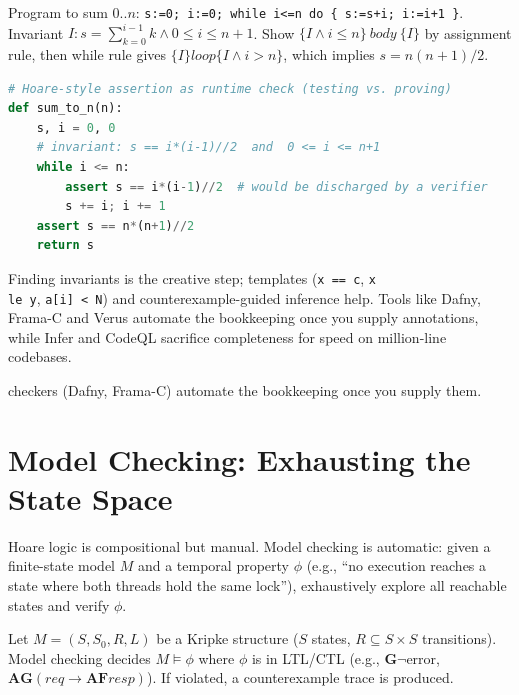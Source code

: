 \begin{example}
Program to sum $0$..$n$: \texttt{s:=0; i:=0; while i<=n do \{ s:=s+i; i:=i+1 \}}. Invariant $I: s=\sum_{k=0}^{i-1}k \land 0\le i\le n+1$. Show $\{I\land i\le n\}~body~\{I\}$ by assignment rule, then while rule gives $\{I\}loop\{I\land i>n\}$, which implies $s=n(n+1)/2$.
\end{example}

\begin{lstlisting}[language=Python]
# Hoare-style assertion as runtime check (testing vs. proving)
def sum_to_n(n):
    s, i = 0, 0
    # invariant: s == i*(i-1)//2  and  0 <= i <= n+1
    while i <= n:
        assert s == i*(i-1)//2  # would be discharged by a verifier
        s += i; i += 1
    assert s == n*(n+1)//2
    return s
\end{lstlisting}

Finding invariants is the creative step; templates (\texttt{x == c}, \texttt{x \\le y}, \texttt{a[i] < N}) and counterexample-guided inference help. Tools like Dafny, Frama-C and Verus automate the bookkeeping once you supply annotations, while Infer and CodeQL sacrifice completeness for speed on million-line codebases.

 checkers (Dafny, Frama-C) automate the bookkeeping once you supply them.

\section{Model Checking: Exhausting the State Space}
\label{sec:model-checking}
Hoare logic is compositional but manual. Model checking is automatic: given a finite-state model $M$ and a temporal property $\phi$ (e.g., ``no execution reaches a state where both threads hold the same lock''), exhaustively explore all reachable states and verify $\phi$.

\begin{definition}
Let $M=(S,S_0,R,L)$ be a Kripke structure ($S$ states, $R\subseteq S\times S$ transitions). Model checking decides $M\models\phi$ where $\phi$ is in LTL/CTL (e.g., $\mathbf{G}\neg\text{error}$, $\mathbf{AG}(req\to \mathbf{AF}resp)$). If violated, a counterexample trace is produced.
\end{definition}


